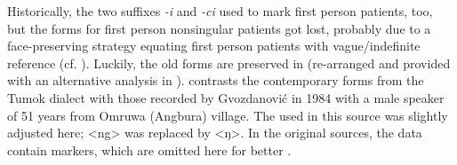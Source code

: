 Historically, the two suffixes \emph{-i} and \emph{-ci} used to mark first person patients, too, but the forms for first person nonsingular patients got lost, probably due to a face-preserving strategy equating first person patients with vague/indefinite reference (cf. ). Luckily, the old forms are preserved in \citet{Gvozdanovic1987How} (re-arranged and provided with an alternative analysis in \citealt{Driem1994The-Yakkha}).  contrasts the contemporary forms from the Tumok dialect with those recorded by Gvozdanović in 1984 with a male speaker of 51 years from Omruwa (Angbura) village. The  used in this source was slightly adjusted here; <ng> was replaced  by <ŋ>.  In the original sources, the data contain  markers, which are omitted here for better . 



